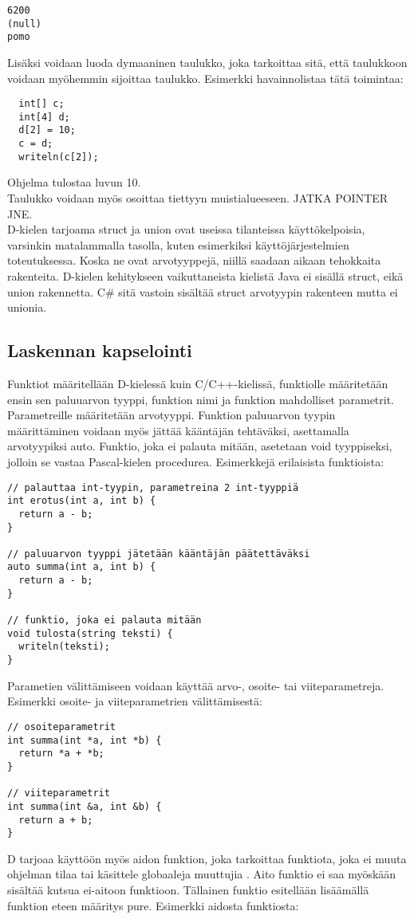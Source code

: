 \documentclass[11pt,oneside,a4paper]{article}
\begin{document}
\begin{verbatim}
6200
(null)
pomo
\end{verbatim}

Lisäksi voidaan luoda dymaaninen taulukko, joka tarkoittaa sitä, että taulukkoon
voidaan myöhemmin sijoittaa taulukko. Esimerkki havainnolistaa tätä toimintaa:

\begin{verbatim}
  int[] c;
  int[4] d;
  d[2] = 10;
  c = d;
  writeln(c[2]);
\end{verbatim}
Ohjelma tulostaa luvun 10. \\
Taulukko voidaan myös osoittaa tiettyyn muistialueeseen. JATKA POINTER JNE. \\


D-kielen tarjoama struct ja union ovat useissa tilanteissa käyttökelpoisia,
varsinkin matalammalla tasolla, kuten esimerkiksi käyttöjärjestelmien
toteutuksessa. Koska ne ovat arvotyyppejä, niillä saadaan aikaan tehokkaita
rakenteita. D-kielen kehitykseen vaikuttaneista kielistä Java ei sisällä struct,
eikä union rakennetta. C\# sitä vastoin sisältää struct arvotyypin rakenteen
mutta ei unionia.

\subsection{Laskennan kapselointi}

Funktiot määritellään D-kielessä kuin C/C++-kielissä, funktiolle määritetään
ensin sen paluuarvon tyyppi, funktion nimi ja funktion mahdolliset parametrit.
Parametreille määritetään arvotyyppi. Funktion paluuarvon tyypin määrittäminen
voidaan myös jättää kääntäjän tehtäväksi, asettamalla arvotyypiksi auto.
Funktio, joka ei palauta mitään, asetetaan void tyyppiseksi, jolloin se vastaa
Pascal-kielen procedurea. Esimerkkejä erilaisista funktioista:

\begin{verbatim}
// palauttaa int-tyypin, parametreina 2 int-tyyppiä
int erotus(int a, int b) {
  return a - b;
}

// paluuarvon tyyppi jätetään kääntäjän päätettäväksi
auto summa(int a, int b) {
  return a - b;
}

// funktio, joka ei palauta mitään
void tulosta(string teksti) {
  writeln(teksti);
}
\end{verbatim}

Parametien välittämiseen voidaan käyttää arvo-, osoite- tai viiteparametreja.
Esimerkki osoite- ja viiteparametrien välittämisestä:
\begin{verbatim}
// osoiteparametrit
int summa(int *a, int *b) {
  return *a + *b;
}

// viiteparametrit
int summa(int &a, int &b) {
  return a + b;
}
\end{verbatim} 
D tarjoaa käyttöön myös aidon funktion, joka tarkoittaa funktiota, joka ei muuta
ohjelman tilaa tai käsittele globaaleja muuttujia \cite{DLA13}. Aito funktio ei
saa myöskään sisältää kutsua ei-aitoon funktioon. Tällainen funktio esitellään
lisäämällä funktion eteen määritys pure. Esimerkki aidosta funktiosta:
\end{document}
